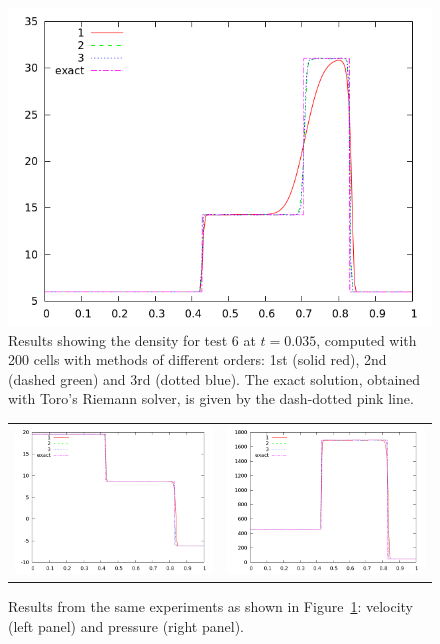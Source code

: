 \documentclass[10pt]{article}
\begin{document}
\begin{figure}[h]
  \begin{center}
     \includegraphics[width=.95\textwidth]{den_T6.png}	
  \end{center}
  \caption{Results showing the density for test 6 at $t=0.035$, computed with 200 cells with methods of different orders: 1st (solid red), 2nd (dashed green) and 3rd (dotted blue). The exact solution, obtained with Toro's Riemann solver, is given by the dash-dotted pink line.}
  \label{fig:den_T6}
\end{figure}

\begin{figure}
  \begin{center}
	\begin{tabular}{cc}
      \includegraphics[width=.475\textwidth]{vel_T6.png} &
	  \includegraphics[width=.475\textwidth]{prs_T6.png}
	\end{tabular}
  \end{center}
  \caption{Results from the same experiments as shown in Figure~\ref{fig:den_T6}:
  velocity (left panel) and pressure (right panel).}
\end{figure}
\end{document}
